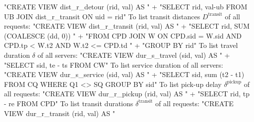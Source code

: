 "CREATE VIEW dist_r_detour (rid, val) AS "
  + "SELECT rid, val-ub FROM UB JOIN dist_r_transit ON uid = rid"
\nwendcode{}\nwdocspar
To list transit distances $D^\textrm{transit}$ of all requests:
\nwenddocs{}\endmoddef{}
"CREATE VIEW dist_r_transit (rid, val) AS "
  + "SELECT rid, SUM (COALESCE (dd, 0)) "
  + "FROM CPD JOIN W ON CPD.sid = W.sid AND CPD.tp < W.t2 AND W.t2 <= CPD.td "
  + "GROUP BY rid"
\nwendcode{}\nwdocspar
To list travel duration $\delta$ of all servers:
\nwenddocs{}\endmoddef{}
"CREATE VIEW dur_s_travel (sid, val) AS "
  + "SELECT sid, te - ts FROM CW"
\nwendcode{}\nwdocspar
To list service duration of all servers:
\nwenddocs{}\endmoddef{}
"CREATE VIEW dur_s_service (sid, val) AS "
  + "SELECT sid, sum (t2 - t1) FROM CQ WHERE Q1 <> SQ GROUP BY sid"
\nwendcode{}\nwdocspar
To list pick-up delay $\delta^\textrm{pickup}$ of all requests:
\nwenddocs{}\endmoddef{}
"CREATE VIEW dur_r_pickup (rid, val) AS "
  + "SELECT rid, tp - re FROM CPD"
\nwendcode{}\nwdocspar
To list transit durations $\delta^\textrm{transit}$ of all requests:
\nwenddocs{}\endmoddef{}
"CREATE VIEW dur_r_transit (rid, val) AS "
